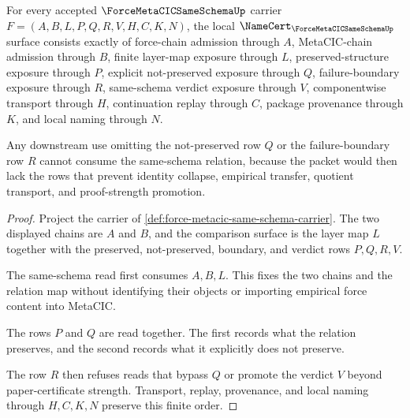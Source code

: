 \begin{theorem}
\label{thm:force-metacic-same-schema-namecert-obligations}
For every accepted $\ForceMetaCICSameSchemaUp$ carrier $F=(A,B,L,P,Q,R,V,H,C,K,N)$, the local $\NameCert_{\ForceMetaCICSameSchemaUp}$ surface consists exactly of force-chain admission through $A$, MetaCIC-chain admission through $B$, finite layer-map exposure through $L$, preserved-structure exposure through $P$, explicit not-preserved exposure through $Q$, failure-boundary exposure through $R$, same-schema verdict exposure through $V$, componentwise transport through $H$, continuation replay through $C$, package provenance through $K$, and local naming through $N$.

Any downstream use omitting the not-preserved row $Q$ or the failure-boundary row $R$ cannot consume the same-schema relation, because the packet would then lack the rows that prevent identity collapse, empirical transfer, quotient transport, and proof-strength promotion.
\end{theorem}
\begin{proof}
Project the carrier of \autoref{def:force-metacic-same-schema-carrier}. The two displayed chains are $A$ and $B$, and the comparison surface is the layer map $L$ together with the preserved, not-preserved, boundary, and verdict rows $P,Q,R,V$.

The same-schema read first consumes $A,B,L$. This fixes the two chains and the relation map without identifying their objects or importing empirical force content into MetaCIC.

The rows $P$ and $Q$ are read together. The first records what the relation preserves, and the second records what it explicitly does not preserve.

The row $R$ then refuses reads that bypass $Q$ or promote the verdict $V$ beyond paper-certificate strength. Transport, replay, provenance, and local naming through $H,C,K,N$ preserve this finite order.
\end{proof}

